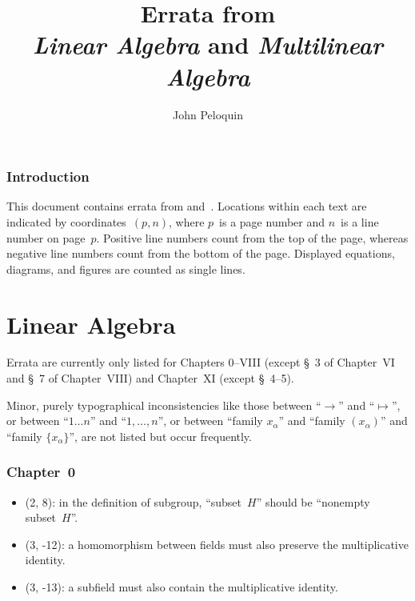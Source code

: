 \documentclass[letterpaper,12pt]{article}
\title{Errata from \\\textit{Linear Algebra} and \textit{Multilinear Algebra}}
\author{John Peloquin}
\date{}
\begin{document}
\maketitle

\section*{Introduction}
This document contains errata from \cite{greub1} and~\cite{greub2}. Locations within each text are indicated by coordinates~\((p,n)\), where \(p\)~is a page number and \(n\)~is a line number on page~\(p\). Positive line numbers count from the top of the page, whereas negative line numbers count from the bottom of the page. Displayed equations, diagrams, and figures are counted as single lines.

\newpage
\part*{Linear Algebra}
Errata are currently only listed for Chapters 0--VIII (except \S~3 of Chapter~VI and \S~7 of Chapter~VIII) and Chapter~XI (except \S~4--5).

Minor, purely typographical inconsistencies like those between ``\(\to\)'' and ``\(\mapsto\)'', or between ``\(1\ldots n\)'' and ``\(1,\ldots,n\)'', or between ``family \(x_{\alpha}\)'' and ``family \((x_{\alpha})\)'' and ``family \(\{x_{\alpha}\}\)'', are not listed but occur frequently.

\section*{Chapter~0}
\begin{itemize}
\item (2, 8): in the definition of subgroup, ``subset~\(H\)'' should be ``nonempty subset~\(H\)''.
\item (3, -12): a homomorphism between fields must also preserve the multiplicative identity.
\item (3, -13): a subfield must also contain the multiplicative identity.
\end{itemize}
\end{document}
